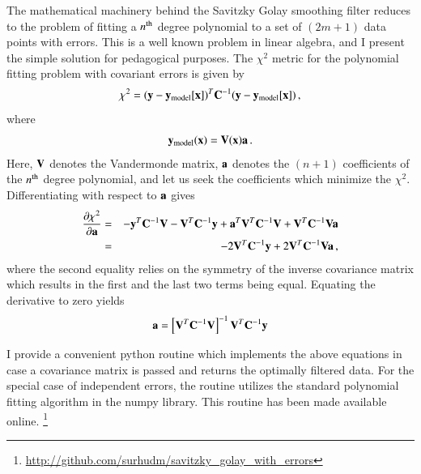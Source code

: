 \documentclass[iop, apj, onecolumn]{emulateapj}
\begin{document}
The mathematical machinery behind the Savitzky Golay smoothing filter reduces to
the problem of fitting a $n^{\rm th}$ degree polynomial to a set of $(2m+1)$
data points with errors. This is a well known problem in linear algebra, and I
present the simple solution for pedagogical purposes. The $\chi^2$ metric for
the polynomial fitting problem with covariant errors is given by
\begin{equation}
        \chi^2 = ({\bf y}-{\bf y}_{\rm model}[{\bf x}])^T {\bf C}^{-1}
                ({\bf y}-{\bf y}_{\rm model}[{\bf x}])\,,
\end{equation}
where
\begin{equation} 
        {\bf y}_{\rm model}({\bf x}) = {\bf V}({\bf x}){\bf a}\,.
\end{equation}
Here, ${\bf V}$ denotes the Vandermonde matrix, ${\bf a}$ denotes the $(n+1)$
coefficients of the $n^{\rm th}$ degree polynomial, and let us seek the
coefficients which minimize the $\chi^2$. Differentiating with respect to ${\bf
a}$ gives
\begin{eqnarray}
        \frac{\partial \chi^2}{\partial {\bf a}} &=& -{\bf y}^T {\bf C}^{-1} {\bf
        V} - {\bf V}^T {\bf C}^{-1} {\bf y} + {\bf a}^T {\bf
        V}^T {\bf C}^{-1} {\bf V} + {\bf V}^T {\bf C}^{-1} {\bf V} {\bf a} \\
        &=& -2 {\bf V}^T {\bf C}^{-1} {\bf y} + 2{\bf V}^T {\bf C}^{-1} {\bf V}
        {\bf a}\,,
\end{eqnarray}
where the second equality relies on the symmetry of the inverse covariance
matrix which results in the first and the last two terms being equal. Equating
the derivative to zero yields
\begin{equation}
        {\bf a} = \left[ {\bf V}^T {\bf C}^{-1} {\bf V}\right]^{-1} {\bf
        V}^T{\bf C}^{-1} {\bf y}
\end{equation}

I provide a convenient python routine which implements the above equations in
case a covariance matrix is passed and returns the optimally filtered data.  For
the special case of independent errors, the routine utilizes the standard
polynomial fitting algorithm in the numpy library. This routine has been made available online.
\footnote{\url{http://github.com/surhudm/savitzky\_golay\_with\_errors}}
\end{document}
